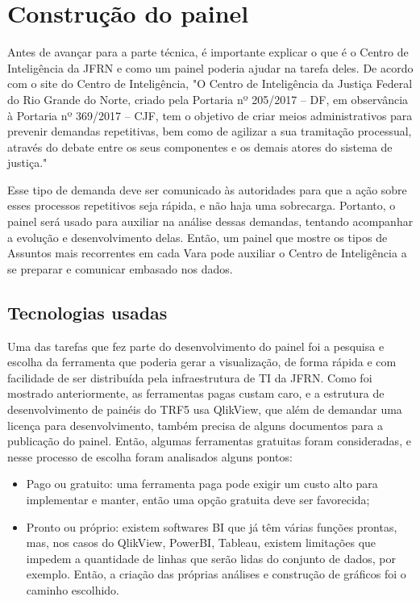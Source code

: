 \chapter{Construção do painel}\label{cap_trabalho_academico}

Antes de avançar para a parte técnica, é importante explicar o que é o Centro de Inteligência da JFRN e como um painel poderia ajudar na tarefa deles. De acordo com o site do Centro de Inteligência, "O Centro de Inteligência da Justiça Federal do Rio Grande do Norte, criado pela Portaria nº 205/2017 – DF, em observância à Portaria nº 369/2017 – CJF, tem o objetivo de criar meios administrativos para prevenir demandas repetitivas, bem como de agilizar a sua tramitação processual, através do debate entre os seus componentes e os demais atores do sistema de justiça."

Esse tipo de demanda deve ser comunicado às autoridades para que a ação sobre esses processos repetitivos seja rápida, e não haja uma sobrecarga. Portanto, o painel será usado para auxiliar na análise dessas demandas, tentando acompanhar a evolução e desenvolvimento delas. Então, um painel que mostre os tipos de Assuntos mais recorrentes em cada Vara pode auxiliar o Centro de Inteligência a se preparar e comunicar embasado nos dados.

\section{Tecnologias usadas}

Uma das tarefas que fez parte do desenvolvimento do painel foi a pesquisa e escolha da ferramenta que poderia gerar a visualização, de forma rápida e com facilidade de ser distribuída pela infraestrutura de TI da JFRN. Como foi mostrado anteriormente, as ferramentas pagas custam caro, e a estrutura de desenvolvimento de painéis do TRF5 usa QlikView, que além de demandar uma licença para desenvolvimento, também precisa de alguns documentos para a publicação do painel. Então, algumas ferramentas gratuitas foram consideradas, e nesse processo de escolha foram analisados alguns pontos:

\begin{itemize}
	\item Pago ou gratuito: uma ferramenta paga pode exigir um custo alto para implementar e manter, então uma opção gratuita deve ser favorecida;
	\item Pronto ou próprio: existem softwares BI que já têm várias funções prontas, mas, nos casos do QlikView, PowerBI, Tableau, existem limitações que impedem a quantidade de linhas que serão lidas do conjunto de dados, por exemplo. Então, a criação das próprias análises e construção de gráficos foi o caminho escolhido.
\end{itemize}

